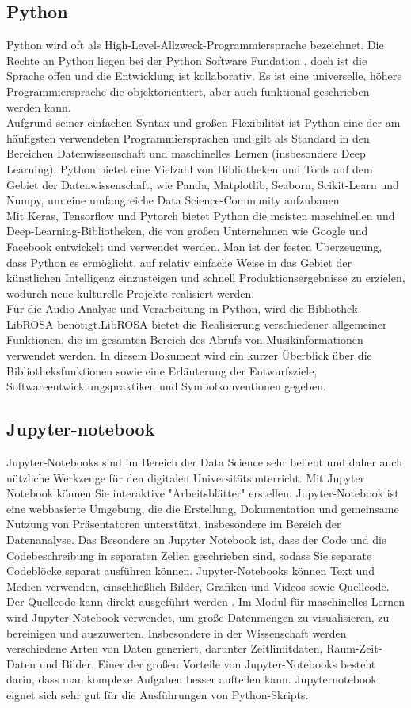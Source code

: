 \documentclass[a4paper,11pt]{article}
\theoremstyle{mytheor}
\begin{document}
\subsection{Python}
Python wird oft als High-Level-Allzweck-Programmiersprache bezeichnet. Die Rechte an Python liegen bei der Python Software Fundation , doch ist die Sprache offen und die Entwicklung ist kollaborativ. Es ist eine universelle, höhere Programmiersprache die objektorientiert, aber auch funktional geschrieben werden kann. \\
Aufgrund seiner einfachen Syntax und großen Flexibilität ist Python eine der am häufigsten verwendeten Programmiersprachen und gilt als Standard in den Bereichen Datenwissenschaft und maschinelles Lernen (insbesondere Deep Learning). Python bietet eine Vielzahl von Bibliotheken und Tools auf dem Gebiet der Datenwissenschaft, wie Panda, Matplotlib, Seaborn, Scikit-Learn und Numpy, um eine umfangreiche Data Science-Community aufzubauen.\\
Mit Keras, Tensorflow und Pytorch bietet Python die meisten maschinellen und Deep-Learning-Bibliotheken, die von großen Unternehmen wie Google und Facebook entwickelt und verwendet werden. Man ist der festen Überzeugung, dass Python es ermöglicht, auf relativ einfache Weise in das Gebiet der künstlichen Intelligenz einzusteigen und schnell Produktionsergebnisse zu erzielen, wodurch neue kulturelle Projekte realisiert werden.\\
Für die Audio-Analyse und-Verarbeitung in Python, wird die Bibliothek LibROSA benötigt.LibROSA bietet die Realisierung verschiedener allgemeiner Funktionen, die im gesamten Bereich des Abrufs von Musikinformationen verwendet werden. In diesem Dokument wird ein kurzer Überblick über die Bibliotheksfunktionen sowie eine Erläuterung der Entwurfsziele, Softwareentwicklungspraktiken und Symbolkonventionen gegeben.
\subsection{Jupyter-notebook}
Jupyter-Notebooks sind im Bereich der Data Science sehr beliebt und daher auch nützliche Werkzeuge für den digitalen Universitätsunterricht. Mit Jupyter Notebook können Sie interaktive "Arbeitsblätter" erstellen. Jupyter-Notebook ist eine webbasierte Umgebung, die die Erstellung, Dokumentation und gemeinsame Nutzung von Präsentatoren unterstützt, insbesondere im Bereich der Datenanalyse. Das Besondere an Jupyter Notebook ist, dass der Code und die Codebeschreibung in separaten Zellen geschrieben sind, sodass Sie separate Codeblöcke separat ausführen können. Jupyter-Notebooks können Text und Medien verwenden, einschließlich Bilder, Grafiken und Videos sowie Quellcode. Der Quellcode kann direkt ausgeführt werden \cite{Jupyter}.
Im Modul für maschinelles Lernen wird Jupyter-Notebook verwendet, um große Datenmengen zu visualisieren, zu bereinigen und auszuwerten. Insbesondere in der Wissenschaft werden verschiedene Arten von Daten generiert, darunter Zeitlimitdaten, Raum-Zeit-Daten und Bilder. Einer der großen Vorteile von Jupyter-Notebooks besteht darin, dass man komplexe Aufgaben besser aufteilen kann. Jupyternotebook eignet sich sehr gut für die Ausführungen von Python-Skripts.
\end{document}
